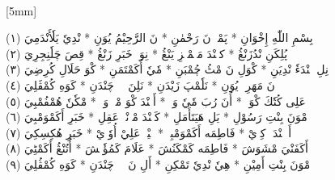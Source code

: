 \documentclass[a4paper, 10pt]{report}
\begin{document}
\begin{center}
 \\
[5mm]
\textcolor{red}{} \\
\end{center}




\begin{center} 

\textarabic{(١) \textcolor{mygreen}{بِسْمِ اللّٰهِ إِخْوَانِ  * پَمْوٖ نَ رَحْمٰنِ  * نَ الرَّحِيْمُ يُوَنِ  * نْدِيٗ يَلٗأَنْدَمِيَ }} 
\\[5mm] 

\textarabic{(٢) \textcolor{mygreen}{پُلِكَنِ نْدُزَنْڠُ  * كهٖنْدَ مَتٖمْبٖزِ يَنْڠُ  * نِوَپٖ خَبَرِ زَنْڠُ  * قِصَ چَلٗنِجِرِيَ }} 
\\[5mm] 

\textarabic{(٣) \textcolor{mygreen}{نِلِ نٖنْدَءٗ نْدِيَنِ  * كْوَلِ نَ مْٹُ چُمْبَنِ  * مٗيٗ أُكَمْتَمَنِ  * كْوَ حَلَالِ كُرِضِيَ }} 
\\[5mm] 

\textarabic{(٤) \textcolor{mygreen}{نَ مَهَرِيٖ يُوَنِ  * نَلٗمْپَ زَيْدَنِ  * نَلِنَ پٖٹٖ چَنْدَنِ  * كَوَهِ كُمْڤَلِيَ }} 
\\[5mm] 

\textarabic{(٥) \textcolor{mygreen}{عَلِى كُتٗكَ كْوَكٖ  * أُنَ رُبَ مٗيٗ وَكٖ  * أَكٖنْدَ كْوَ مْكٖ وَكٖ  * مْكٗنٗ هُمْفُمْبِيَ }} 
\\[5mm] 

\textarabic{(٦) \textcolor{mygreen}{مْوَنَ بِنْتِ رَسُوْلِ  * يَلِ هَيَتَأَمَلِ  * كَنٖنْدَ مْوٖنْيٖ عَقِلِ  * خَبَرِ أَكَمْوَمْبِيَ }} 
\\[5mm] 

\textarabic{(٧) \textcolor{mygreen}{أَكٖنٖنْدَءٖ كِزٖيْ  * فَاطِمَه أَكَمْوَمْبِيٖ  * شٖيْخٖ عَلِيْ أُوٗزٖيْ  * خَبَرِ هُكِسِكِيَ }} 
\\[5mm] 

\textarabic{(٨) \textcolor{mygreen}{أَكَفَنْيَ مْشَوَشَ  * فَاطِمَه كَمْكَنُشَ  * عَلَامَ كَمُؤٗنٖشَ  * أُتُنْڠُ أَكَمْٹِيَ }} 
\\[5mm] 

\textarabic{(٩) \textcolor{mygreen}{مْوَنَ بِنْتِ أَمِيْنِ  * هِيٗ نْدِيٗ تَمْكِنِ  * أَلِ نَ پٖٹٖ چَنْدَنِ  * كَوَهِ كُمْڤُلِيَ }} 
\\[5mm] 


\end{center}
\end{document}
